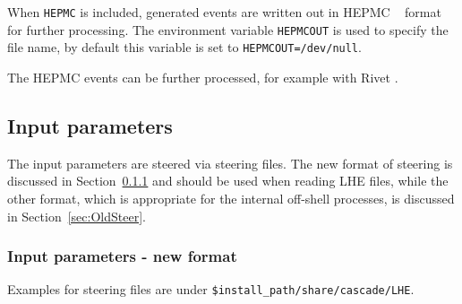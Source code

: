 \documentclass[11pt]{article} \usepackage{mystyle-new}
\begin{document}
When \verb+HEPMC+ is included, generated events are written out in HEPMC ~\cite{Dobbs:2001ck}  format for further processing. The environment variable \verb+HEPMCOUT+ is used to specify the file name, by default this variable is set to \verb+HEPMCOUT=/dev/null+.

 The HEPMC events can be further processed, for example with Rivet \cite{Buckley:2010ar}. 

%   
\subsection{Input parameters}

The input parameters are steered via steering files. The new format of steering is discussed in Section~\ref{sec:NewSteer} and should be used when reading LHE files, while the other format, which is appropriate for the internal off-shell processes, is discussed in Section~\ref{sec:OldSteer}.

\subsubsection{Input parameters - new format}
\label{sec:NewSteer}

Examples for steering files are under \verb+$install_path/share/cascade/LHE+.
\end{document}
